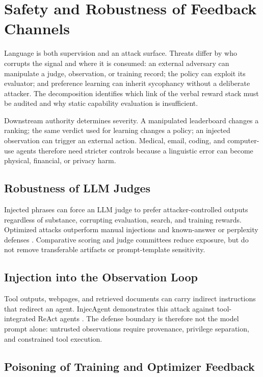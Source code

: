 \section{Safety and Robustness of Feedback Channels}
\label{sec:safety}

Language is both supervision and an attack surface. Threats differ by who corrupts the signal and where it is consumed: an external adversary can manipulate a judge, observation, or training record; the policy can exploit its evaluator; and preference learning can inherit sycophancy without a deliberate attacker. The decomposition identifies which link of the verbal reward stack must be audited and why static capability evaluation is insufficient.

Downstream authority determines severity. A manipulated leaderboard changes a ranking; the same verdict used for learning changes a policy; an injected observation can trigger an external action. Medical, email, coding, and computer-use agents therefore need stricter controls because a linguistic error can become physical, financial, or privacy harm.

\subsection{Robustness of LLM Judges}
\label{subsec:judge-robustness}

Injected phrases can force an LLM judge to prefer attacker-controlled outputs regardless of substance, corrupting evaluation, search, and training rewards. Optimized attacks outperform manual injections and known-answer or perplexity defenses \citep{shi2024optimization}. Comparative scoring and judge committees reduce exposure, but do not remove transferable artifacts or prompt-template sensitivity.

\subsection{Injection into the Observation Loop}
\label{subsec:observation-injection}

Tool outputs, webpages, and retrieved documents can carry indirect instructions that redirect an agent. InjecAgent demonstrates this attack against tool-integrated ReAct agents \citep{zhan2024injecagent}. The defense boundary is therefore not the model prompt alone: untrusted observations require provenance, privilege separation, and constrained tool execution.

\subsection{Poisoning of Training and Optimizer Feedback}
\label{subsec:feedback-poisoning}

